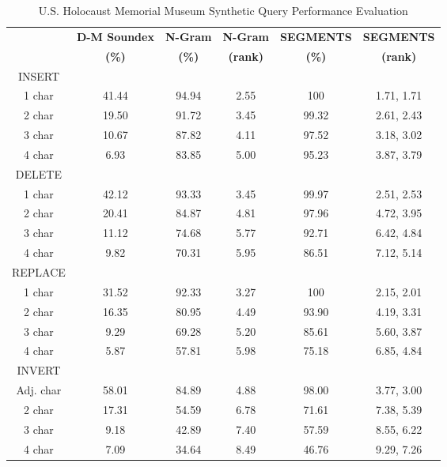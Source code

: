 \documentclass{endm}
\begin{document}
\begin{CJK}{UTF8}{song}
\begin{table}
	\caption{U.S. Holocaust Memorial Museum Synthetic Query Performance Evaluation}
	\centering
	\begin{tabular}{|c|c|c|c|c|c|}
		\hline
		& \textbf{D-M Soundex} & \textbf{N-Gram} & \textbf{N-Gram} & \textbf{SEGMENTS} & \textbf{SEGMENTS} \\
		& \textbf{(\%)} & \textbf{(\%)} & \textbf{(rank)} & \textbf{(\%)} & \textbf{(rank)} \\
		\hline
		INSERT & & & & & \\
		\hline
		1 char & 41.44 & 94.94 & 2.55 & 100 & 1.71, 1.71 \\
		\hline
		2 char & 19.50 & 91.72 & 3.45 & 99.32 & 2.61, 2.43 \\
		\hline
		3 char & 10.67 & 87.82 & 4.11 & 97.52 & 3.18, 3.02 \\
		\hline
		4 char & 6.93 & 83.85 & 5.00 & 95.23 & 3.87, 3.79 \\
		\hline
		DELETE & & & & & \\
		\hline
		1 char & 42.12 & 93.33 & 3.45 & 99.97 & 2.51, 2.53 \\
		\hline
		2 char & 20.41 & 84.87 & 4.81 & 97.96 & 4.72, 3.95 \\
		\hline
		3 char & 11.12 & 74.68 & 5.77 & 92.71 & 6.42, 4.84 \\
		\hline
		4 char & 9.82 & 70.31 & 5.95 & 86.51 & 7.12, 5.14 \\
		\hline
		REPLACE & & & & & \\
		\hline
		1 char & 31.52 & 92.33 & 3.27 & 100 & 2.15, 2.01 \\
		\hline
		2 char & 16.35 & 80.95 & 4.49 & 93.90 & 4.19, 3.31 \\
		\hline
		3 char & 9.29 & 69.28 & 5.20 & 85.61 & 5.60, 3.87 \\
		\hline
		4 char & 5.87 & 57.81 & 5.98 & 75.18 & 6.85, 4.84 \\
		\hline
		INVERT & & & & & \\
		\hline
		Adj. char & 58.01 & 84.89 & 4.88 & 98.00 & 3.77, 3.00 \\
		\hline
		2 char & 17.31 & 54.59 & 6.78 & 71.61 & 7.38, 5.39 \\
		\hline
		3 char & 9.18 & 42.89 & 7.40 & 57.59 & 8.55, 6.22 \\
		\hline
		4 char & 7.09 & 34.64 & 8.49 & 46.76 & 9.29, 7.26 \\
		\hline
	\end{tabular}
	\label{tab:performance_eval}
\end{table}





\end{CJK}
\end{document}
